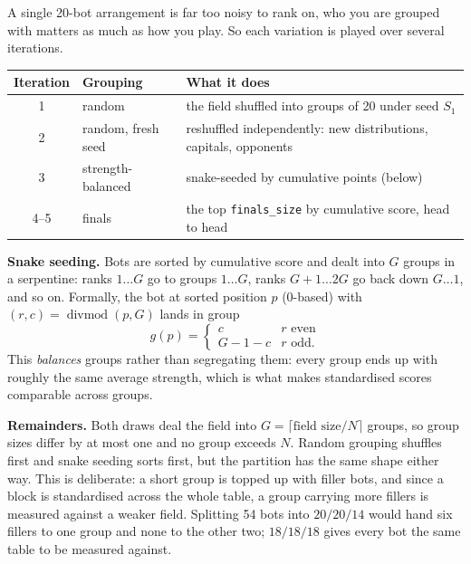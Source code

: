 \documentclass[11pt,a4paper]{article}
\newif\ifreleased
\newcommand{\code}[1]{\texttt{\small #1}}
\begin{document}
A single 20-bot arrangement is far too noisy to rank on, who you are grouped
with matters as much as how you play.\ifreleased{} In variations 3 and 4, where
payoffs move between players rather than being created by the auction, it matters
more still.\fi{} So each variation is played over several iterations.

\begin{center}
\begin{tabular}{@{}cll@{}}
\toprule
Iteration & Grouping & What it does \\
\midrule
1 & random & the field shuffled into groups of 20 under seed $S_1$ \\
2 & random, fresh seed & reshuffled independently: new distributions,
                         capitals, opponents \\
3 & strength-balanced & snake-seeded by cumulative points (below) \\
4--5 & finals & the top \code{finals\_size} by cumulative score, head to head \\
\bottomrule
\end{tabular}
\end{center}

\noindent
\textbf{Snake seeding.} Bots are sorted by cumulative score and dealt into $G$
groups in a serpentine: ranks $1 \dots G$ go to groups $1 \dots G$, ranks
$G{+}1 \dots 2G$ go back down $G \dots 1$, and so on. Formally, the bot at
sorted position $p$ (0-based) with $(r, c) = \operatorname{divmod}(p, G)$ lands
in group
\begin{equation}
  g(p) = \begin{cases}
    c & r \text{ even} \\
    G - 1 - c & r \text{ odd.}
  \end{cases}
\end{equation}
This \emph{balances} groups rather than segregating them: every group ends up
with roughly the same average strength, which is what makes standardised scores
comparable across groups.

\textbf{Remainders.} Both draws deal the field into
$G = \lceil \text{field size} / N \rceil$ groups, so group sizes differ by at
most one and no group exceeds $N$. Random grouping shuffles first and snake
seeding sorts first, but the partition has the same shape either way. This is
deliberate: a short group is topped up with filler bots, and since a block is
standardised across the whole table, a group carrying more fillers is measured
against a weaker field. Splitting 54 bots into $20/20/14$ would hand six fillers
to one group and none to the other two; $18/18/18$ gives every bot the same
table to be measured against.
\end{document}
